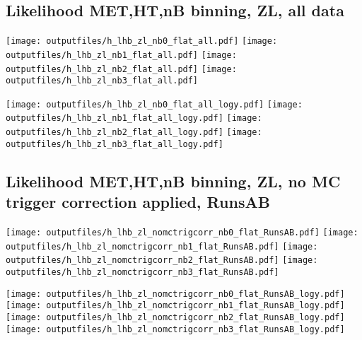 \documentclass[11pt]{article}
\begin{document}
   \clearpage

    \subsection{ Likelihood MET,HT,nB binning, ZL, all data}

    \noindent
     \texttt{[image: outputfiles/h\_lhb\_zl\_nb0\_flat\_all.pdf]}
     \texttt{[image: outputfiles/h\_lhb\_zl\_nb1\_flat\_all.pdf]}
     \texttt{[image: outputfiles/h\_lhb\_zl\_nb2\_flat\_all.pdf]}
     \texttt{[image: outputfiles/h\_lhb\_zl\_nb3\_flat\_all.pdf]}

    \noindent
     \texttt{[image: outputfiles/h\_lhb\_zl\_nb0\_flat\_all\_logy.pdf]}
     \texttt{[image: outputfiles/h\_lhb\_zl\_nb1\_flat\_all\_logy.pdf]}
     \texttt{[image: outputfiles/h\_lhb\_zl\_nb2\_flat\_all\_logy.pdf]}
     \texttt{[image: outputfiles/h\_lhb\_zl\_nb3\_flat\_all\_logy.pdf]}

   \clearpage

    \subsection{ Likelihood MET,HT,nB binning, ZL, no MC trigger correction applied, RunsAB }

    \noindent
     \texttt{[image: outputfiles/h\_lhb\_zl\_nomctrigcorr\_nb0\_flat\_RunsAB.pdf]}
     \texttt{[image: outputfiles/h\_lhb\_zl\_nomctrigcorr\_nb1\_flat\_RunsAB.pdf]}
     \texttt{[image: outputfiles/h\_lhb\_zl\_nomctrigcorr\_nb2\_flat\_RunsAB.pdf]}
     \texttt{[image: outputfiles/h\_lhb\_zl\_nomctrigcorr\_nb3\_flat\_RunsAB.pdf]}

    \noindent
     \texttt{[image: outputfiles/h\_lhb\_zl\_nomctrigcorr\_nb0\_flat\_RunsAB\_logy.pdf]}
     \texttt{[image: outputfiles/h\_lhb\_zl\_nomctrigcorr\_nb1\_flat\_RunsAB\_logy.pdf]}
     \texttt{[image: outputfiles/h\_lhb\_zl\_nomctrigcorr\_nb2\_flat\_RunsAB\_logy.pdf]}
     \texttt{[image: outputfiles/h\_lhb\_zl\_nomctrigcorr\_nb3\_flat\_RunsAB\_logy.pdf]}

   \clearpage

\end{document}
